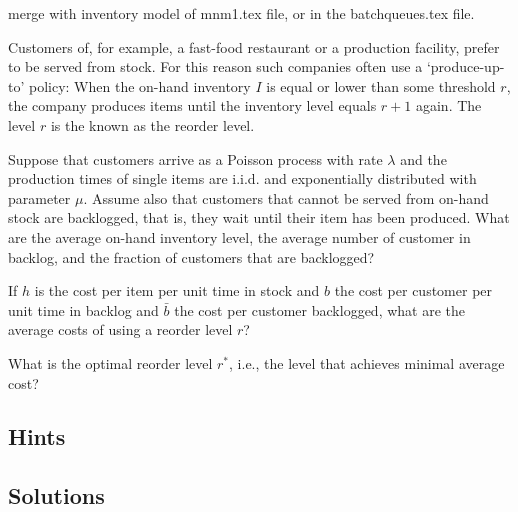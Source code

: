 \begin{question}[use=false]
\label{q:basestock}

merge with inventory model of mnm1.tex file, or in the batchqueues.tex file.

Customers of, for example, a fast-food restaurant or a production
facility, prefer to be served from stock. For this reason such
companies often use a `produce-up-to' policy: When the on-hand
inventory $I$ is equal or lower than some threshold $r$, the company
produces items until the inventory level equals $r+1$ again. The level
$r$ is the known as the reorder level.

Suppose that customers arrive as a Poisson process with rate $\lambda$
and the production times of single items are i.i.d. and exponentially
distributed with parameter $\mu$. Assume also that customers that
cannot be served from on-hand stock are backlogged, that is, they wait
until their item has been produced. What are the average on-hand
inventory level, the average number of customer in backlog, and the
fraction of customers that are backlogged?

If $h$ is the cost per item per unit time in stock and $b$ the cost
per customer per unit time in backlog and $\bar b$ the cost per customer
backlogged, what are the average costs of using a reorder level $r$? 

What is the optimal reorder level $r^*$, i.e., the level that achieves
minimal average cost?

\begin{hint}
  
\end{hint}

  \begin{solution}
  \end{solution}
\end{question}


\subsection*{Hints}

\subsection*{Solutions}

\clearpage

